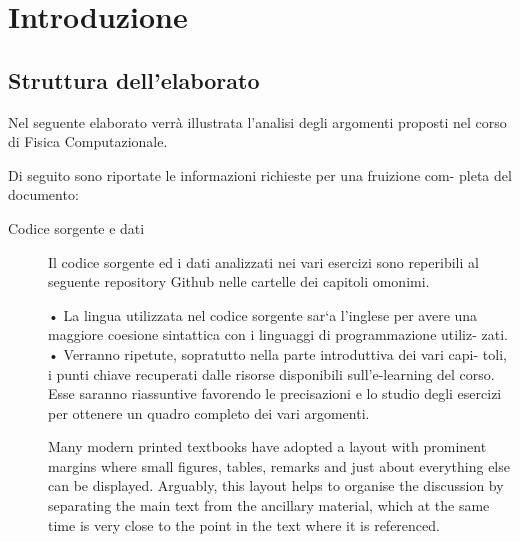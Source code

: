 \setchapterpreamble[u]{\margintoc}
\chapter{Introduzione}

\section{Struttura dell'elaborato}

Nel seguente elaborato verrà illustrata l’analisi degli argomenti proposti nel
corso di Fisica Computazionale.

Di seguito sono riportate le informazioni richieste per una fruizione com-
pleta del documento:

\begin{description}
    \item[Codice sorgente e dati] Il codice sorgente ed i dati analizzati nei vari esercizi sono reperibili al
seguente repository Github nelle cartelle dei capitoli omonimi.

• La lingua utilizzata nel codice sorgente sar`a l’inglese per avere una
maggiore coesione sintattica con i linguaggi di programmazione utiliz-
zati.
• Verranno ripetute, sopratutto nella parte introduttiva dei vari capi-
toli, i punti chiave recuperati dalle risorse disponibili sull’e-learning del
corso. Esse saranno riassuntive favorendo le precisazioni e lo studio
degli esercizi per ottenere un quadro completo dei vari argomenti.

Many modern printed textbooks have adopted a layout with prominent 
margins where small figures, tables, remarks and just about everything 
else can be displayed. Arguably, this layout helps to organise the 
	discussion by separating the main text from the ancillary material, 
	which at the same time is very close to the point in the text where 
	it is referenced.
\end{description}




